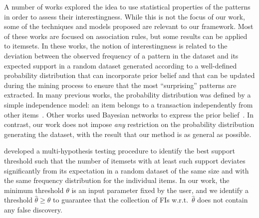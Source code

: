 A number of works explored the idea to use statistical properties of the
patterns in order to assess their interestingness. While this is not the focus
of our work, some of the techniques and models proposed are relevant to our
framework. Most of these works are focused on association rules, but some
results can be applied to itemsets. In these works, the notion of
interestingness is related to the deviation between the observed frequency of a
pattern in the dataset and its expected support in a random dataset generated
according to a well-defined probability distribution that can incorporate prior
belief and that can be updated during the mining process to ensure that the most
``surprising'' patterns are extracted. In many previous works, the probability
distribution was defined by a simple independence model: an item belongs to a
transaction independently from other
items~\citep{SilversteinBM98,MegiddoS98,DuMouchelP01,GionisMMT07,Hamalainen10,KirschMAPUV12}.
Other works used Bayesian networks to express the prior
belief~\citep{JaroszewiczSS09}. In contrast, our work does not impose \emph{any}
restriction on the probability distribution generating the dataset, with the
result that our method is as general as possible.

\citet{KirschMAPUV12} developed a multi-hypothesis
testing procedure to identify the best support threshold such that the number of
itemsets with at least such support deviates significantly from its expectation
in a random dataset of the same size and with the same frequency distribution
for the individual items. In our work, the minimum threshold $\theta$ is an input
parameter fixed by the user, and we identify a threshold $\hat{\theta}\ge\theta$
to guarantee that the collection of FIs w.r.t.~$\hat{\theta}$ does not contain
any false discovery.



